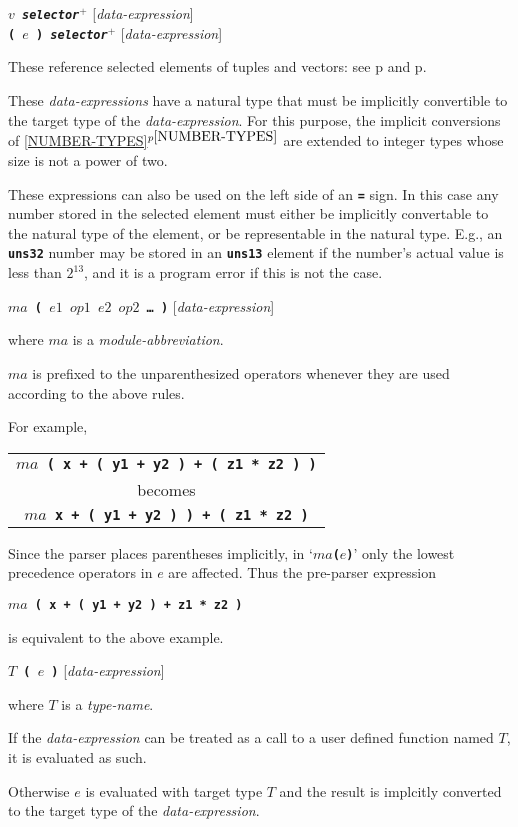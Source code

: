 \documentclass[12pt]{article}
\newcommand{\TT}[1]{{\tt \bfseries #1}}
\newcommand{\itemref}[1]{\ref{#1}$^{p\pageref{#1}}$}
\newcommand{\pagref}[1]{p\pageref{#1}}
\newcommand{\PLUS}[1][]{{$^{+#1}$}}
\newenvironment{indpar}[1][0.3in]%
	{\begin{list}{}%
		     {\setlength{\itemsep}{0in}%
		      \setlength{\topsep}{0in}%
		      \setlength{\parsep}{1ex}%
		      \setlength{\labelwidth}{#1}%
		      \setlength{\leftmargin}{#1}%
		      \addtolength{\leftmargin}{\labelsep}}%
	 \item}%
	{\end{list}}
\begin{document}
\TT{$v$ {\em selector}\PLUS{}}
\hfill [{\em data-expression}] \\
\TT{( $e$ ) {\em selector}\PLUS{}}
\hfill [{\em data-expression}]
\begin{indpar}
These reference selected elements of tuples and vectors:
see \pagref{GET-TUPLE-ELEMENT} and \pagref{SET-TUPLE-ELEMENT}.

These {\em data-expressions} have a natural type that must be
implicitly convertible to the target type of the {\em data-expression}.
For this purpose, the implicit conversions of \itemref{NUMBER-TYPES}
are extended to integer types whose size is not a power of two.

These expressions can also be used on the left side of an
\TT{=} sign.  In this case any number stored in the selected
element must either be implicitly convertable to the natural
type of the element, or be representable in the natural type.
E.g., an \TT{uns32} number may be stored in an \TT{uns13} element
if the number's actual value is less than $2^{13}$, and it is
a program error if this is not the case.
\end{indpar}

\TT{$ma$ ( $e1$ $op1$ $e2$ $op2$ \ldots{} )}
\hfill [{\em data-expression}]
\label{MODULE-ABBREVIATION-SEMANTICS}
\begin{indpar}
where $ma$ is a {\em module-abbreviation}.

$ma$ is prefixed to the unparenthesized
operators whenever they are used according to the above
rules.

For example,
\begin{center}
\begin{tabular}{c}
\TT{$ma$ ( x + ( y1 + y2 ) + ( z1 * z2 ) )} \\
becomes \\
\TT{$ma$ x + ( y1 + y2 ) ) + ( z1 * z2 )}
\end{tabular}
\end{center}

Since the parser places parentheses implicitly, in `\TT{$ma$($e$)}'
only the lowest precedence operators in $e$ are affected.
Thus the pre-parser expression
\begin{center}
\TT{$ma$ ( x + ( y1 + y2 ) + z1 * z2 )} \\
\end{center}
is equivalent to the above example.

\end{indpar}

\TT{$T$ ( $e$ )}
\hfill [{\em data-expression}]
\begin{indpar}
where $T$ is a {\em type-name}.

If the {\em data-expression} can be treated as a call to a
user defined function named $T$, it is evaluated as such.

Otherwise $e$ is evaluated with target type $T$ and the result is implcitly
converted to the target type of the {\em data-expression}.
\end{indpar}
\end{document}
